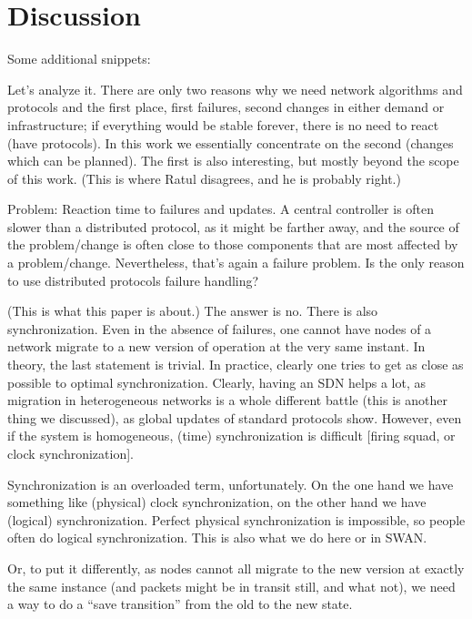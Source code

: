 \section{Discussion}
\label{sec:discussion}

Some additional snippets:

Let’s analyze it. There are only two reasons why we need network algorithms and protocols and the first place, first failures, second changes in either demand or infrastructure; if everything would be stable forever, there is no need to react (have protocols). In this work we essentially concentrate on the second (changes which can be planned). The first is also interesting, but mostly beyond the scope of this work. (This is where Ratul disagrees, and he is probably right.)

Problem: Reaction time to failures and updates. A central controller is often slower than a distributed protocol, as it might be farther away, and the source of the problem/change is often close to those components that are most affected by a problem/change. Nevertheless, that’s again a failure problem. Is the only reason to use distributed protocols failure handling?

(This is what this paper is about.) The answer is no. There is also synchronization. Even in the absence of failures, one cannot have nodes of a network migrate to a new version of operation at the very same instant. In theory, the last statement is trivial. In practice, clearly one tries to get as close as possible to optimal synchronization. Clearly, having an SDN helps a lot, as migration in heterogeneous networks is a whole different battle (this is another thing we discussed), as global updates of standard protocols show. However, even if the system is homogeneous, (time) synchronization is difficult [firing squad, or clock synchronization].

Synchronization is an overloaded term, unfortunately. On the one hand we have something like (physical) clock synchronization, on the other hand we have (logical) synchronization. Perfect physical synchronization is impossible, so people often do logical synchronization. This is also what we do here or in SWAN.

Or, to put it differently, as nodes cannot all migrate to the new version at exactly the same instance (and packets might be in transit still, and what not), we need a way to do a ``save transition'' from the old to the new state.

